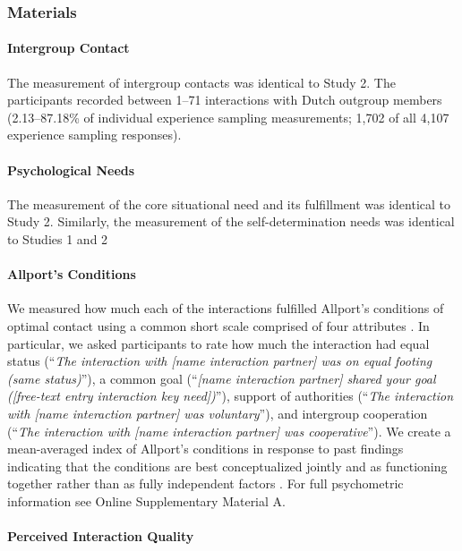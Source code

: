 \subsubsection{Materials}

\paragraph{Intergroup Contact}

The measurement of intergroup contacts was identical to Study 2. The
participants recorded between 1--71 interactions with Dutch outgroup
members (2.13--87.18\% of individual experience sampling measurements;
1,702 of all 4,107 experience sampling responses).

\paragraph{Psychological Needs}

The measurement of the core situational need and its fulfillment was
identical to Study 2. Similarly, the measurement of the
self-determination needs was identical to Studies 1 and 2

\paragraph{Allport's Conditions}

We measured how much each of the interactions fulfilled Allport's
conditions of optimal contact using a common short scale comprised of
four attributes \citep{Islam1993, Voci2003, AlRamiah2012a, Dixon2005}.
In particular, we asked participants to rate how much the interaction
had equal status
(``\textit{The interaction with [name interaction partner] was on equal footing (same status)}''),
a common goal
(``\textit{[name interaction partner] shared your goal ([free-text entry interaction key need])}''),
support of authorities
(``\textit{The interaction with [name interaction partner] was voluntary}''),
and intergroup cooperation
(``\textit{The interaction with [name interaction partner] was cooperative}'').
We create a mean-averaged index of Allport's conditions in response to
past findings indicating that the conditions are best conceptualized
jointly and as functioning together rather than as fully independent
factors \citep[][, p. 766]{Pettigrew2006}. For full psychometric
information see Online Supplementary Material A.

\paragraph{Perceived Interaction Quality}

